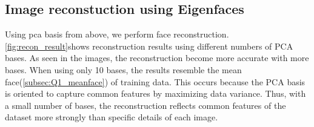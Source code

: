 \subsection{Image reconstuction using Eigenfaces}
Using pca basis from above, we perform face reconstruction. \cref{fig:recon_result}shows reconstruction results using different numbers of PCA bases. As seen in the images, the reconstruction become more accurate with more bases. When using only 10 bases, the results resemble the mean face(\cref{subsec:Q1_meanface}) of training data. This occurs because the PCA basis is oriented to capture common features by maximizing data variance. Thus, with a small number of bases, the reconstruction reflects common features of the dataset more strongly than specific details of each image.
\vspace{-0.2cm}

